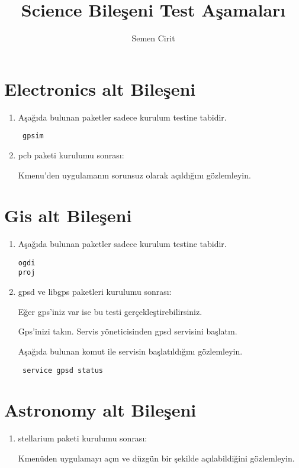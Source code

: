\documentclass[a4paper,10pt]{article}
\title{Science Bileşeni Test Aşamaları}
\author{Semen Cirit}
\begin{document}
\maketitle
\section{Electronics alt Bileşeni}
\begin{enumerate}
 \item Aşağıda bulunan paketler sadece kurulum testine tabidir.
\begin{verbatim}
 gpsim
\end{verbatim}
\item pcb paketi kurulumu sonrası:

Kmenu'den uygulamanın sorunsuz olarak açıldığını gözlemleyin.
\end{enumerate}


\section{Gis alt Bileşeni}
\begin{enumerate}
\item Aşağıda bulunan paketler sadece kurulum testine tabidir.
\begin{verbatim}
ogdi
proj
\end{verbatim}

 \item gpsd ve libgps paketleri kurulumu sonrası:

Eğer gps'iniz var ise bu testi gerçekleştirebilirsiniz.

Gps'inizi takın. Servis yöneticisinden gpsd servisini başlatın.

Aşağıda bulunan komut ile servisin başlatıldığını gözlemleyin.
\begin{verbatim}
 service gpsd status
\end{verbatim}


\end{enumerate}


\section{Astronomy alt Bileşeni}
\begin{enumerate}
 \item stellarium paketi kurulumu sonrası:

Kmenüden uygulamayı açın ve düzgün bir şekilde açılabildiğini gözlemleyin. 
\end{enumerate}
\end{document}
